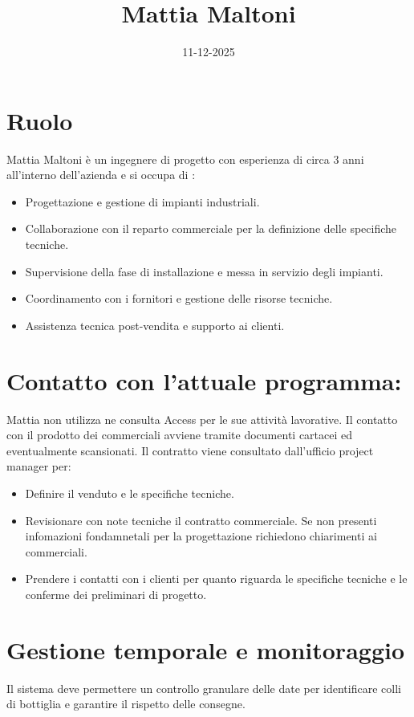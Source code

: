 \documentclass[12pt, a4paper]{article} %
\title{Mattia Maltoni}
\date{11-12-2025}
\begin{document}
\maketitle

\section{Ruolo}
Mattia Maltoni è un ingegnere di progetto con esperienza di circa 3 anni
all'interno dell'azienda e si occupa di :
\begin{itemize}
    \item Progettazione e gestione di impianti industriali.
    \item Collaborazione con il reparto commerciale per la definizione delle specifiche
          tecniche.
    \item Supervisione della fase di installazione e messa in servizio degli impianti.
    \item Coordinamento con i fornitori e gestione delle risorse tecniche.
    \item Assistenza tecnica post-vendita e supporto ai clienti.
\end{itemize}

\section{Contatto con l'attuale programma:}
Mattia non utilizza ne consulta Access per le sue attività lavorative. Il
contatto con il prodotto dei commerciali avviene tramite documenti cartacei ed
eventualmente scansionati. Il contratto viene consultato dall'ufficio project
manager per:
\begin{itemize}
    \item Definire il venduto e le specifiche tecniche.
    \item Revisionare con note tecniche il contratto commerciale. Se non presenti
          infomazioni fondamnetali per la progettazione richiedono chiarimenti ai
          commerciali.
    \item Prendere i contatti con i clienti per quanto riguarda le specifiche tecniche e
          le conferme dei preliminari di progetto.
\end{itemize}

\section{Gestione temporale e monitoraggio}
Il sistema deve permettere un controllo granulare delle date per identificare
colli di bottiglia e garantire il rispetto delle consegne.
\end{document}

